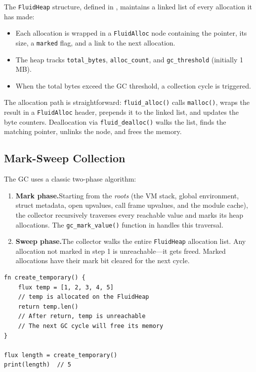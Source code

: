 The \lstinline|FluidHeap| structure, defined in , maintains a linked list of every allocation it has made:

\begin{itemize}
  \item Each allocation is wrapped in a \lstinline|FluidAlloc| node containing the pointer, its size, a \lstinline|marked| flag, and a link to the next allocation.
  \item The heap tracks \lstinline|total_bytes|, \lstinline|alloc_count|, and \lstinline|gc_threshold| (initially 1\,MB).
  \item When the total bytes exceed the GC threshold, a collection cycle is triggered.
\end{itemize}

The allocation path is straightforward: \lstinline|fluid_alloc()| calls \lstinline|malloc()|, wraps the result in a \lstinline|FluidAlloc| header, prepends it to the linked list, and updates the byte counters.
Deallocation via \lstinline|fluid_dealloc()| walks the list, finds the matching pointer, unlinks the node, and frees the memory.

\subsection{Mark-Sweep Collection}


The GC uses a classic two-phase algorithm:

\begin{enumerate}
  \item \textbf{Mark phase.}\quad Starting from the \emph{roots} (the VM stack, global environment, struct metadata, open upvalues, call frame upvalues, and the module cache), the collector recursively traverses every reachable value and marks its heap allocations.
  The \lstinline|gc_mark_value()| function in  handles this traversal.

  \item \textbf{Sweep phase.}\quad The collector walks the entire \lstinline|FluidHeap| allocation list.
  Any allocation not marked in step 1 is unreachable---it gets freed.
  Marked allocations have their mark bit cleared for the next cycle.
\end{enumerate}

\begin{lstlisting}[language=Lattice, caption={GC reclaims unreachable fluid values}]
fn create_temporary() {
    flux temp = [1, 2, 3, 4, 5]
    // temp is allocated on the FluidHeap
    return temp.len()
    // After return, temp is unreachable
    // The next GC cycle will free its memory
}

flux length = create_temporary()
print(length)  // 5
\end{lstlisting}

